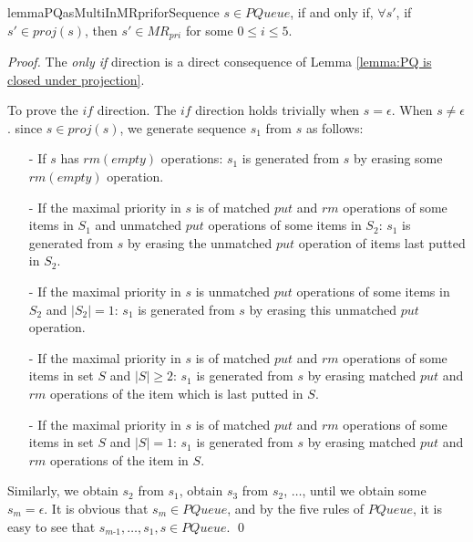 \begin{restatable}{lemma}{PQasMultiInMRpriforSequence}
\label{lemma:PQ as multi in MRpri for sequence}
$s \in \textit{PQueue}$, if and only if, $\forall s'$, if $s' \in \textit{proj}(s)$, then $s' \in \textit{MR}_{\textit{pri}}$ for some $0 \leq i \leq 5$.
\end{restatable}

\begin {proof}

The \textit{only if} direction is a direct consequence of Lemma \ref{lemma:PQ is closed under projection}.

To prove the $\textit{if}$ direction. The $\textit{if}$ direction holds trivially when $s = \epsilon$. When $s \neq \epsilon$. since $s \in \textit{proj}(s)$, we generate sequence $s_1$ from $s$ as follows:

\begin{itemize}
\setlength{\itemsep}{0.5pt}
\item[-] If $s$ has $\textit{rm}(\textit{empty})$ operations: $s_1$ is generated from $s$ by erasing some $\textit{rm}(\textit{empty})$ operation.

\item[-] If the maximal priority in $s$ is of matched $\textit{put}$ and $\textit{rm}$ operations of some items in $S_1$ and unmatched $\textit{put}$ operations of some items in $S_2$: $s_1$ is generated from $s$ by erasing the unmatched $\textit{put}$ operation of items last putted in $S_2$.

\item[-] If the maximal priority in $s$ is unmatched $\textit{put}$ operations of some items in $S_2$ and $\vert S_2 \vert =1$: $s_1$ is generated from $s$ by erasing this unmatched $\textit{put}$ operation.

\item[-] If the maximal priority in $s$ is of matched $\textit{put}$ and $\textit{rm}$ operations of some items in set $S$ and $\vert S \vert \geq 2$: $s_1$ is generated from $s$ by erasing matched $\textit{put}$ and $\textit{rm}$ operations of the item which is last putted in $S$.

\item[-] If the maximal priority in $s$ is of matched $\textit{put}$ and $\textit{rm}$ operations of some items in set $S$ and $\vert S \vert = 1$: $s_1$ is generated from $s$ by erasing matched $\textit{put}$ and $\textit{rm}$ operations of the item in $S$.
\end{itemize}

Similarly, we obtain $s_2$ from $s_1$, obtain $s_3$ from $s_2$, $\ldots$, until we obtain some $s_m = \epsilon$. It is obvious that $s_m \in \textit{PQueue}$, and by the five rules of $\textit{PQueue}$, it is easy to see that $s_{\textit{m-1}},\ldots,s_1,s \in \textit{PQueue}$. \qed
\end {proof}



